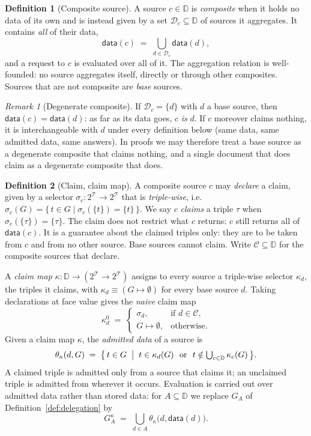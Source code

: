 \documentclass[11pt,a4paper]{article}
\theoremstyle{definition}
\newtheorem{definition}{Definition}
\theoremstyle{plain}
\theoremstyle{remark}
\newtheorem*{remark}{Remark}
\newcommand{\Dd}{\mathcal{D}}
\newcommand{\Du}{\mathbb{D}}
\newcommand{\Tt}{\mathcal{T}}
\newcommand{\dataf}{\mathsf{data}}
\begin{document}
\begin{definition}[Composite source]
\label{def:composite}
A source $c \in \Du$ is \emph{composite} when it holds no data of its own and is
instead given by a set $\Dd_c \subseteq \Du$ of sources it aggregates. It contains
\emph{all} of their data,
\[
  \dataf(c) \;=\; \bigcup_{d \in \Dd_c} \dataf(d),
\]
and a request to $c$ is evaluated over all of it. The aggregation relation is
well-founded: no source aggregates itself, directly or through other composites.
Sources that are not composite are \emph{base} sources.
\end{definition}

\begin{remark}[Degenerate composite]
\label{rem:degenerate}
If $\Dd_c = \{d\}$ with $d$ a base source, then $\dataf(c) = \dataf(d)$: as far as its
data goes, $c$ \emph{is} $d$. If $c$ moreover claims nothing, it is interchangeable
with $d$ under every definition below (same data, same admitted data, same answers).
In proofs we may therefore treat a base source as a degenerate composite that claims
nothing, and a single document that does claim as a degenerate composite that does.
\end{remark}

\begin{definition}[Claim, claim map]
\label{def:authoritativeness}
A composite source $c$ may \emph{declare} a claim, given by a selector
$\sigma_c : 2^{\Tt} \to 2^{\Tt}$ that is \emph{triple-wise}, i.e.\
$\sigma_c(G) = \{\, t \in G \mid \sigma_c(\{t\}) = \{t\} \,\}$. We say $c$
\emph{claims} a triple $\tau$ when $\sigma_c(\{\tau\}) = \{\tau\}$. The claim does
not restrict what $c$ returns: $c$ still returns all of $\dataf(c)$. It is a guarantee
about the claimed triples only: they are to be taken from $c$ and from no other
source. Base sources cannot claim. Write $\mathcal{C} \subseteq \Du$ for the
composite sources that declare.

A \emph{claim map} $\kappa : \Du \to (2^{\Tt} \to 2^{\Tt})$ assigns to every source a
triple-wise selector $\kappa_d$, the triples it claims, with $\kappa_d \equiv
(G \mapsto \emptyset)$ for every base source $d$. Taking declarations at face value
gives the \emph{naive} claim map
\[
  \kappa^{0}_d \;=\;
  \begin{cases}
    \sigma_d, & \text{if } d \in \mathcal{C},\\[2pt]
    G \mapsto \emptyset, & \text{otherwise.}
  \end{cases}
\]
Given a claim map $\kappa$, the \emph{admitted data} of a source is
\begin{equation}
  \label{eq:theta}
  \theta_\kappa(d, G) \;=\;
  \bigl\{\, t \in G \;\bigm|\; t \in \kappa_d(G)
  \ \text{ or }\ t \notin \textstyle\bigcup_{c \in \Du} \kappa_c(G) \,\bigr\}.
\end{equation}
A claimed triple is admitted only from a source that claims it; an unclaimed triple
is admitted from wherever it occurs. Evaluation is carried out over admitted data
rather than stored data: for $A \subseteq \Du$ we replace $G_A$ of
Definition~\ref{def:delegation} by
\[
  G^{\kappa}_A \;=\; \bigcup_{d \in A} \theta_\kappa\bigl(d, \dataf(d)\bigr).
\]
\end{definition}
\end{document}
